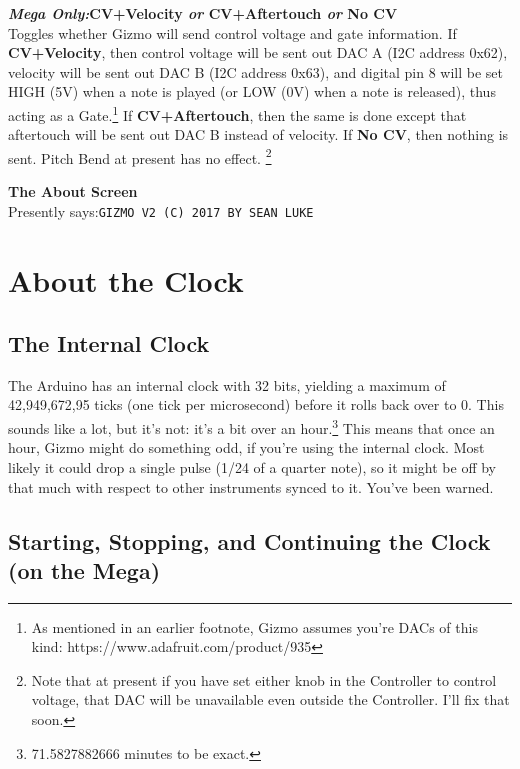 \documentclass{article}
\begin{document}
\begin{description}
	\item{\bf  \textit{Mega Only:}\quad CV+Velocity \textit{or} CV+Aftertouch \textit{or} No CV}\\
		Toggles whether Gizmo will send control voltage and gate information.  If {\bf CV+Velocity}, then control voltage will be sent out DAC A (I2C address 0x62), velocity will be sent out DAC B (I2C address 0x63), and digital pin 8 will be set HIGH (5V) when a note is played (or LOW (0V) when a note is released), thus acting as a Gate.\footnote{As mentioned in an earlier footnote, Gizmo assumes you're DACs of this kind: https:/\!/www.adafruit.com/product/935} If {\bf CV+Aftertouch}, then the same is done except that aftertouch will be sent out DAC B instead of velocity.  If {\bf No CV}, then nothing is sent.  Pitch Bend at present has no effect.	\footnote{Note that at present if you have set either knob in the Controller to control voltage, that DAC will be unavailable even outside the Controller.  I'll fix that soon.}
		
	\item{\bf The About Screen}\\
		Presently says:\quad \texttt{GIZMO V2 (C) 2017 BY SEAN LUKE}
	\end{description}

\clearpage
	\section{About the Clock}

	\subsection{The Internal Clock}
	\label{internalclock}

The Arduino has an internal clock with 32 bits, yielding a maximum of 42,949,672,95 ticks (one tick per microsecond) before it rolls back over to 0.  This sounds like a lot, but it's not: it's a bit over an hour.\footnote{71.5827882666 minutes to be exact.}  This means that once an hour, Gizmo might do something odd, if you're using the internal clock.  Most likely it could drop a single pulse (1/24 of a quarter note), so it might be off by that much with respect to other instruments synced to it.  You've been warned.

\subsection{Starting, Stopping, and Continuing the Clock (on the Mega)}
	\label{startingclock}
\end{document}
